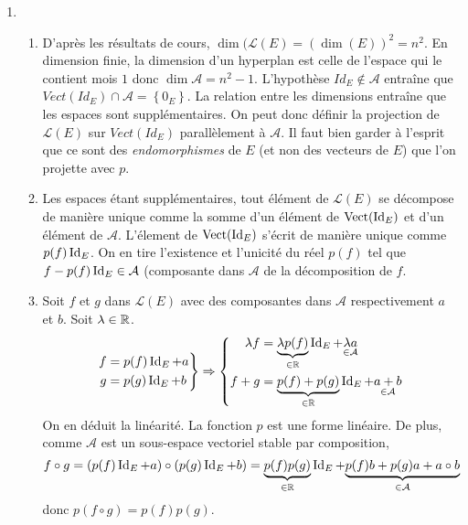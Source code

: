 \begin{enumerate}
  \item 
\begin{enumerate}
\item D'après les résultats de cours, $\dim(\mathcal{L}(E)= (\dim(E))^2 = n^2$. En dimension finie, la dimension d'un hyperplan est celle de l'espace qui le contient mois $1$ donc $\dim \mathcal{A} = n^2 -1$.\newline
L'hypoth\`{e}se $Id_{E}\notin \mathcal{A}$ entra\^{i}ne que $Vect(Id_{E})\cap \mathcal{A=}\left\{ 0_{E}\right\}$. La relation entre
les dimensions entra\^{i}ne que les espaces sont suppl\'{e}mentaires.
On peut donc d\'{e}finir la projection de $\mathcal{L}(E)$ sur $Vect(Id_{E})$ parall\`{e}lement \`{a} $\mathcal{A}$. Il faut bien garder à l'esprit que ce sont des \emph{endomorphismes} de $E$ (et non des vecteurs de $E$) que l'on projette avec $p$.

\item Les espaces étant supplémentaires, tout élément de $\mathcal{L}(E)$ se décompose de manière unique comme la somme d'un élément de $\operatorname{Vect}(\operatorname{Id}_E)$ et d'un élément de $\mathcal{A}$. L'élement de $\operatorname{Vect}(\operatorname{Id}_E)$ s'écrit de manière unique comme $p(f)\operatorname{Id}_E$. On en tire l'existence et l'unicité du réel $p(f)$ tel que $f-p(f)\operatorname{Id}_E \in \mathcal{A}$ (composante dans $\mathcal{A}$ de la décomposition de $f$.

\item Soit $f$ et $g$ dans $\mathcal{L}(E)$ avec des composantes dans $\mathcal{A}$ respectivement $a$ et $b$. Soit $\lambda \in \mathbb{R}$.
\begin{displaymath}
\left. 
\begin{aligned}
f &= p(f)\operatorname{Id}_E + a \\ g &= p(g)\operatorname{Id}_E + b  
\end{aligned}
\right\rbrace 
\Rightarrow
\left\lbrace 
\begin{aligned}
\lambda f &= \underset{\in \mathbb{R}}{\underbrace{\lambda p(f)}}\operatorname{Id}_E + \underset{\in \mathcal{A}}{\lambda a} \\
f + g &= \underset{\in \mathbb{R}}{\underbrace{p(f) + p(g)}}\operatorname{Id}_E + \underset{\in \mathcal{A}}{a + b} 
\end{aligned}
\right. 
\end{displaymath}
On en déduit la linéarité. La fonction $p$ est une forme linéaire.\newline
De plus, comme $\mathcal{A}$ est un sous-espace vectoriel stable par composition,
\begin{displaymath}
f \circ g = \left(p(f)\operatorname{Id}_E + a\right)\circ \left(p(g)\operatorname{Id}_E + b\right)
= \underset{\in \mathbb{R}}{\underbrace{p(f)p(g)}}\operatorname{Id}_E + \underset{\in \mathcal{A}}{\underbrace{p(f)b + p(g)a + a\circ b}}
\end{displaymath}
donc $p(f \circ g) = p(f)p(g)$.
\end{enumerate}


\end{enumerate}
